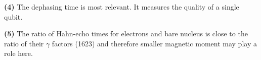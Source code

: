 \documentclass{article}
\makeatletter
\newcommand*{\shifttext}[1]{%
  \settowidth{\@tempdima}{#1}%
  \hspace{-\@tempdima}#1%
}
\newcommand{\plabel}[1]{%
\shifttext{\textbf{#1}\quad}%
}
\makeatother
\begin{document}
\plabel{(4)}%
The dephasing time is most relevant.
It measures the quality of a single qubit.

\plabel{(5)}%
The ratio of Hahn-echo times for electrons and bare nucleus is close to the ratio of their $\gamma$ factors (\num{1623}) and therefore smaller magnetic moment may play a role here.

% 
% 
\end{document}
